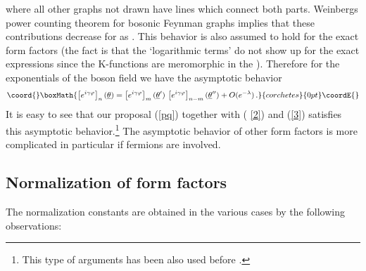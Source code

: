 \documentclass[a4paper,12pt]{article}
\begin{document}
where all other graphs not drawn have lines which connect both parts.
Weinbergs power counting theorem for bosonic Feynman graphs implies that
these contributions decrease for \myHighlight{$\lambda \rightarrow \infty $}\coordHE{} as \coordHE{}. This behavior is also assumed to hold for the exact
form factors (the fact is that the `logarithmic terms' \coordHE{} do not
show up for the exact expressions since the K-functions are meromorphic in
the \coordHE{}). Therefore for the exponentials of the boson field \coordHE{} we have the asymptotic behavior 
\[\coord{}\boxMath{
\left[ e^{i\gamma \varphi }\right] _{n}(\underline{\theta })=\left[
e^{i\gamma \varphi }\right] _{m}(\underline{\theta }^{\prime })\,\left[
e^{i\gamma \varphi }\right] _{n-m}(\underline{\theta }^{\prime \prime
})+O(e^{-\lambda })\,. 
}{corchetes}{0pt}\coordE{}\]
It is easy to see \cite{BK1,BK2} that our proposal (\ref{pq}) together with (%
\ref{2}) and (\ref{3}) satisfies this asymptotic behavior.\footnote{%
This type of arguments has been also used before \cite{KW,FMS,KM,MS}.} The
asymptotic behavior of other form factors is more complicated \cite{BK} in
particular if fermions are involved.

\subsection*{Normalization of form factors}

The normalization constants are obtained in the various cases by the
following observations:
\end{document}

